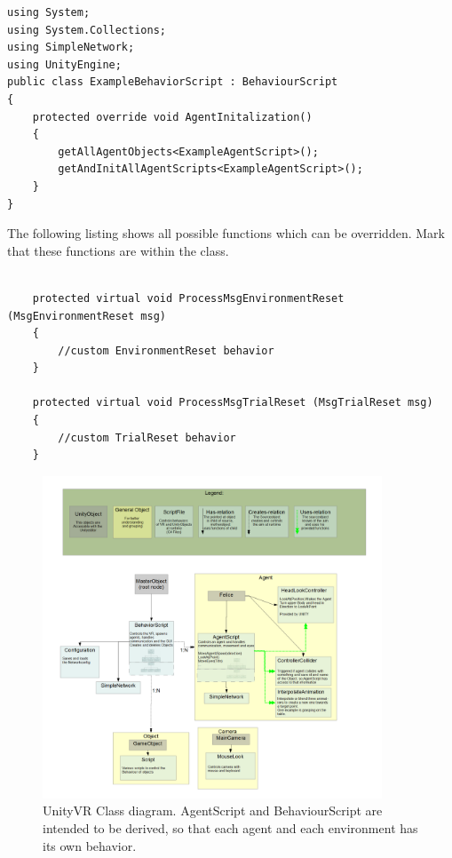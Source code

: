 \documentclass[10pt,final]{scrreprt}
\begin{document}
\begin{lstlisting}
using System;
using System.Collections;
using SimpleNetwork;
using UnityEngine;
public class ExampleBehaviorScript : BehaviourScript
{
    protected override void AgentInitalization()
    {
        getAllAgentObjects<ExampleAgentScript>();
        getAndInitAllAgentScripts<ExampleAgentScript>();
    }
}
\end{lstlisting}


The following listing shows all possible functions which can be overridden. Mark that these functions are within the class.

\begin{lstlisting}

    protected virtual void ProcessMsgEnvironmentReset (MsgEnvironmentReset msg)
    {	
    	//custom EnvironmentReset behavior 		
    }

    protected virtual void ProcessMsgTrialReset (MsgTrialReset msg)
    {
      	//custom TrialReset behavior
    }

\end{lstlisting}


\begin{figure}[h]
\begin{center}
\includegraphics[width=0.9\textwidth]{images/VR-Classdiagram.png}
\end{center}
\caption{UnityVR Class diagram. AgentScript and BehaviourScript are intended to be derived, so that each agent and each environment has its own behavior.}
\label{Classdiagram}
\end{figure}
\end{document}
